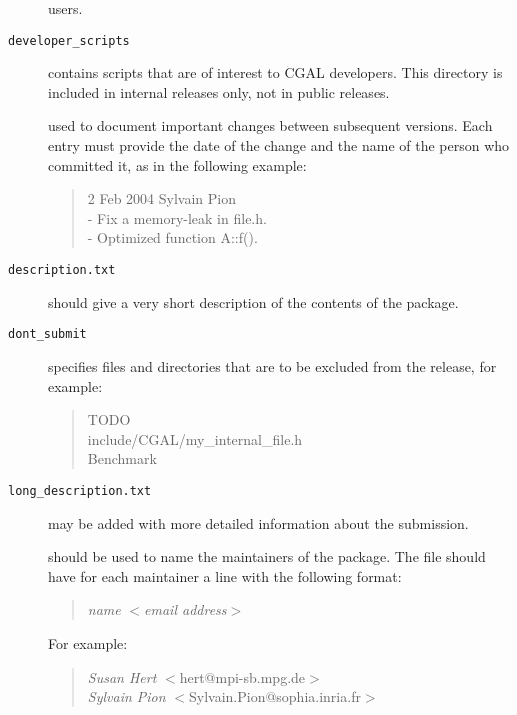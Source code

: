 \begin{description}
       users.
     \item[{\tt developer\_scripts}] contains
       scripts that are of interest to CGAL developers. This directory
       is included in internal releases only, not in public releases.
  \item[\ccAnchor{example/changes.txt}{{\tt changes.txt}}]%
     used to document important
    changes between subsequent versions. Each entry must provide the
    date of the change and the name of the person who committed it, as
    in the following example:
       \begin{verse}
       2 Feb 2004  Sylvain Pion\\
       - Fix a memory-leak in file.h.\\
       - Optimized function A::f().
       \end{verse}

  \item[{\tt description.txt}]%
       should give a very short description of the contents of the package. 
  \item[{\tt dont\_submit}]%
     specifies files and directories
    that are to be excluded from the release, for example:
    \begin{verse}
      TODO\\
      include/CGAL/my\_internal\_file.h\\
      Benchmark      
    \end{verse}
  \item[{\tt long\_description.txt}]%
       may be added with more detailed information about the submission. 
  \item[\ccAnchor{maintainer}{{\tt maintainer}}]%
       should be used to name the maintainers of the package. The file should
       have for each maintainer a line with the following format:
       \begin{verse}
       {\it name} $<${\it email address}$>$\\
       \end{verse}
       For example:
       \begin{verse}
       {\it Susan Hert} $<$hert@mpi-sb.mpg.de$>$\\
       {\it Sylvain Pion} $<$Sylvain.Pion@sophia.inria.fr$>$\\
       \end{verse}
\end{description}

